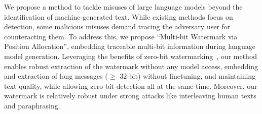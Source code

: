 We propose a method to tackle misuses of large language models beyond the identification of machine-generated text. While existing methods focus on detection, some malicious misuses demand tracing the adversary user for counteracting them. To address this, we propose ``Multi-bit Watermark via Position Allocation'', embedding traceable multi-bit information during language model generation. Leveraging the benefits of zero-bit watermarking~\citep{kirchenbauer2023watermark}, our method enables robust extraction of the watermark without any model access, embedding and extraction of long messages ($\geq$ 32-bit) without finetuning, and maintaining text quality, while allowing zero-bit detection all at the same time. Moreover, our watermark is relatively robust under strong attacks like interleaving human texts and paraphrasing.  